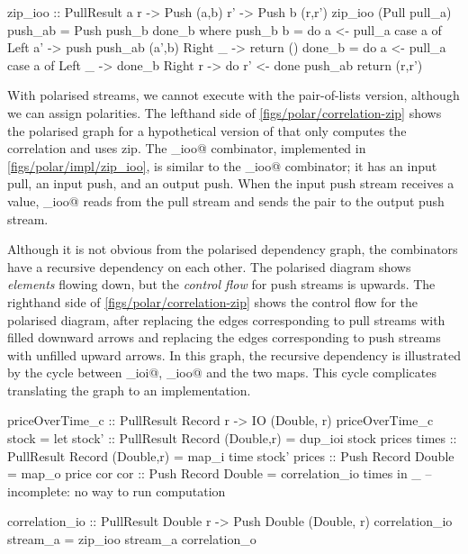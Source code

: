 \begin{haskell}[float,caption=Polarised implementation of \Hs/zip\_ioo/,label=figs/polar/impl/zip_ioo]
zip_ioo :: PullResult a r -> Push (a,b) r' -> Push b (r,r')
zip_ioo (Pull pull_a) push_ab = Push push_b done_b
 where
  push_b b = do
   a <- pull_a
   case a of
    Left a' -> push push_ab (a',b)
    Right _ -> return ()
  done_b = do
   a <- pull_a
   case a of
    Left _  -> done_b
    Right r -> do
     r' <- done push_ab
     return (r,r')
\end{haskell}


With polarised streams, we cannot execute \Hs@priceOverTime@ with the pair-of-lists version, although we can assign polarities.
The lefthand side of \cref{figs/polar/correlation-zip} shows the polarised graph for a hypothetical version of \Hs@priceOverTime@ that only computes the correlation and uses zip.
The \Hs@zip_ioo@ combinator, implemented in \cref{figs/polar/impl/zip_ioo}, is similar to the \Hs@join_ioo@ combinator; it has an input pull, an input push, and an output push.
When the input push stream receives a value, \Hs@zip_ioo@ reads from the pull stream and sends the pair to the output push stream.


Although it is not obvious from the polarised dependency graph, the combinators have a recursive dependency on each other.
The polarised diagram shows \emph{elements} flowing down, but the \emph{control flow} for push streams is upwards.
The righthand side of \cref{figs/polar/correlation-zip} shows the control flow for the polarised diagram, after replacing the edges corresponding to pull streams with filled downward arrows and replacing the edges corresponding to push streams with unfilled upward arrows.
In this graph, the recursive dependency is illustrated by the cycle between \Hs@dup_ioi@, \Hs@zip_ioo@ and the two maps.
This cycle complicates translating the graph to an implementation.

\begin{haskell}[float,caption={Incomplete polarised implementation of \Hs/priceOverTime_c/},label=figs/polar/impl/priceOverTime_c]
priceOverTime_c :: PullResult Record r -> IO (Double, r)
priceOverTime_c stock =
  let stock' :: PullResult Record (Double,r)
              = dup_ioi stock prices
      times  :: PullResult Record (Double,r)
              = map_i time stock'
      prices :: Push Record Double
              = map_o price cor
      cor    :: Push Record Double
              = correlation_io times
  in _ -- incomplete: no way to run computation

correlation_io :: PullResult Double r -> Push Double (Double, r)
correlation_io stream_a = zip_ioo stream_a correlation_o
\end{haskell}

